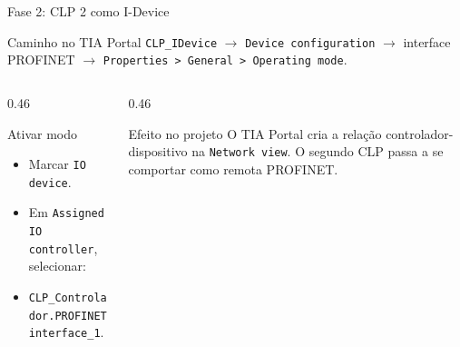 \documentclass[10pt, aspectratio=169]{beamer}
\begin{document}
\begin{frame}{Fase 2: CLP 2 como I-Device}
    \small
    \begin{block}{Caminho no TIA Portal}
        \texttt{CLP\_IDevice} $\rightarrow$ \texttt{Device configuration} $\rightarrow$ interface PROFINET $\rightarrow$
        \texttt{Properties > General > Operating mode}.
    \end{block}

    \begin{columns}[T,totalwidth=\textwidth]
        \begin{column}{0.46\textwidth}
            \begin{block}{Ativar modo}
                \begin{itemize}
                    \item Marcar \texttt{IO device}.
                    \item Em \texttt{Assigned IO controller}, selecionar:
                    \item \texttt{CLP\_Controlador.PROFINET interface\_1}.
                \end{itemize}
            \end{block}
        \end{column}
        \begin{column}{0.46\textwidth}
            \begin{block}{Efeito no projeto}
                O TIA Portal cria a rela\c{c}\~ao controlador-dispositivo na \texttt{Network view}. O segundo CLP passa a se comportar como remota PROFINET.
            \end{block}
        \end{column}
    \end{columns}
\end{frame}
\end{document}
